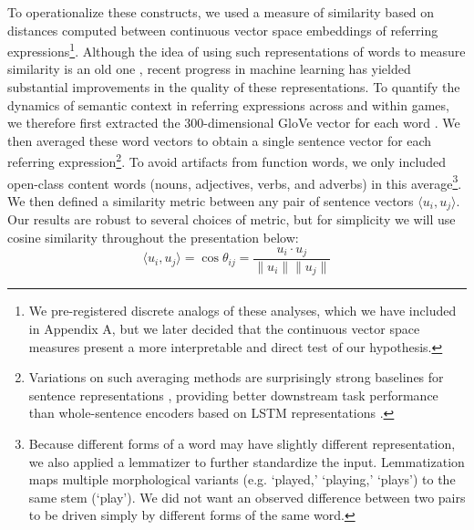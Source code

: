 \documentclass[alpha-refs]{wiley-article}
\begin{document}
To operationalize these constructs, we used a measure of similarity based on distances computed between continuous vector space embeddings of referring expressions\footnote{We pre-registered discrete analogs of these analyses, which we have included in Appendix A, but we later decided that the continuous vector space measures present a more interpretable and direct test of our hypothesis.}.
Although the idea of using such representations of words to measure similarity is an old one \citep{osgood1952nature,landauer_solution_1997,bengio_neural_2003}, recent progress in machine learning has yielded substantial improvements in the quality of these representations.
To quantify the dynamics of semantic context in referring expressions across and within games, we therefore first extracted the 300-dimensional GloVe vector for each word \citep{pennington2014glove}.
We then averaged these word vectors to obtain a single sentence vector for each referring expression\footnote{Variations on such averaging methods are surprisingly strong baselines for sentence representations \citep{arora2017asimple}, providing better downstream task performance than whole-sentence encoders based on LSTM representations \citep{KirosEtAl15_SkipThought}.}.
To avoid artifacts from function words, we only included open-class content words (nouns, adjectives, verbs, and adverbs) in this average\footnote{Because different forms of a word may have slightly different representation, we also applied a lemmatizer to further standardize the input. Lemmatization maps multiple morphological variants (e.g. `played,' `playing,' `plays') to the same stem (`play'). We did not want an observed difference between two pairs to be driven simply by different forms of the same word.}.
We then defined a similarity metric between any pair of sentence vectors $\langle u_i, u_j \rangle$.
Our results are robust to several choices of metric, but for simplicity we will use cosine similarity throughout the presentation below: $$\langle u_i, u_j \rangle = \cos \theta_{ij} = \frac{u_i \cdot u_j}{\| u_i\| \| u_j \|}$$
\end{document}
